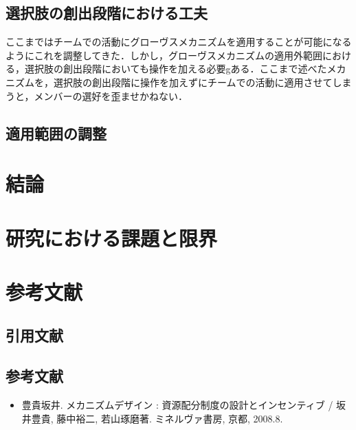 \documentclass[a4paper, 11pt]{jsarticle}
\begin{document}
\subsection{選択肢の創出段階における工夫}
ここまではチームでの活動にグローヴスメカニズムを適用することが可能になるようにこれを調整してきた．しかし，グローヴスメカニズムの適用外範囲における，選択肢の創出段階においても操作を加える必要gある．ここまで述べたメカニズムを，選択肢の創出段階に操作を加えずにチームでの活動に適用させてしまうと，メンバーの選好を歪ませかねない．
\subsection{適用範囲の調整}
\section{結論}
\section{研究における課題と限界}
\section*{参考文献}
\subsection*{引用文献}
\begingroup
\renewcommand{\section}[2]{}


\endgroup
\subsection*{参考文献}
\begin{itemize}[leftmargin=*]
\item[] 豊貴坂井. メカニズムデザイン : 資源配分制度の設計とインセンティブ / 坂井豊貴, 藤中裕二, 若山琢磨著. ミネルヴァ書房, 京都, 2008.8.
\end{itemize}
\end{document}
